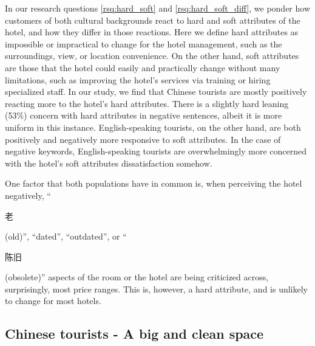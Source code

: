 \documentclass[smallextended,natbib]{svjour3}       %
\begin{document}
    In our research questions \ref{rsq:hard_soft} and \ref{rsq:hard_soft_diff}, we ponder how customers of both cultural backgrounds react to hard and soft attributes of the hotel, and how they differ in those reactions. Here we define hard attributes as impossible or impractical to change for the hotel management, such as the surroundings, view, or location convenience. On the other hand, soft attributes are those that the hotel could easily and practically change without many limitations, such as improving the hotel's services via training or hiring specialized staff. In our study, we find that Chinese tourists are mostly positively reacting more to the hotel's hard attributes. There is a slightly hard leaning (53\%) concern with hard attributes in negative sentences, albeit it is more uniform in this instance. English-speaking tourists, on the other hand, are both positively and negatively more responsive to soft attributes. In the case of negative keywords, English-speaking tourists are overwhelmingly more concerned with the hotel's soft attributes dissatisfaction somehow.

    One factor that both populations have in common is, when perceiving the hotel negatively, ``\begin{CJK}{UTF8}{gbsn}老\end{CJK} (old)'', ``dated'', ``outdated'', or ``\begin{CJK}{UTF8}{gbsn}陈旧\end{CJK} (obsolete)'' aspects of the room or the hotel are being criticized across, surprisingly, most price ranges. This is, however, a hard attribute, and is unlikely to change for most hotels.
    
  \subsection{Chinese tourists - A big and clean space}\label{disc:zh}
\end{document}
